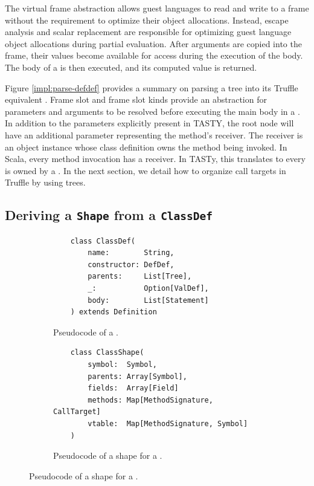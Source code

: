 The virtual frame abstraction allows guest languages to read and write to a frame without the requirement to optimize their object allocations.
Instead, escape analysis and scalar replacement are responsible for optimizing guest language object allocations during partial evaluation. 
After arguments are copied into the frame, their values become available for access during the execution of the body.
The body of a  is then executed, and its computed value is returned.

Figure \ref{impl:parse-defdef} provides a summary on parsing a  tree into its Truffle equivalent .
Frame slot and frame slot kinds provide an abstraction for parameters and arguments to be resolved before executing the main body in a .
In addition to the parameters explicitly present in TASTY, the root node will have an additional parameter representing the method's receiver.
The receiver is an object instance whose class definition owns the method being invoked.
In Scala, every method invocation has a receiver.
In TASTy, this translates to every  is owned by a .
In the next section, we detail how to organize call targets in Truffle by using  trees.

\subsection{Deriving a \texttt{Shape} from a \texttt{ClassDef}}

\begin{figure}[!htb]
	\centering
	\begin{subfigure}[b]{0.48\textwidth}
	\begin{verbatim}
	class ClassDef(
		name:        String,
		constructor: DefDef, 
		parents:     List[Tree], 
		_:           Option[ValDef], 
		body:        List[Statement]
	) extends Definition
		\end{verbatim}
	\caption{Pseudocode of a .}
	\label{recall:classdef}
	\end{subfigure}
	\hfill
	\begin{subfigure}[b]{0.48\textwidth}
	\begin{verbatim}
	class ClassShape(
		symbol:  Symbol,
		parents: Array[Symbol],
		fields:  Array[Field]
		methods: Map[MethodSignature, CallTarget]
		vtable:  Map[MethodSignature, Symbol]
	)
	\end{verbatim}
	\caption{Pseudocode of a shape for a .}
	\label{impl:classshape}
	\end{subfigure}
\end{figure}


